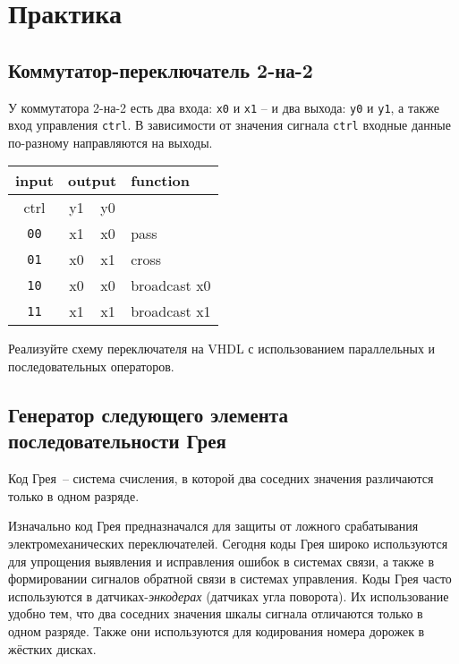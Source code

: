 \section{Практика}
\subsection{Коммутатор-переключатель 2-на-2}
У коммутатора 2-на-2 есть два входа: \lstinline?x0? и \lstinline?x1? – и два выхода: \lstinline?y0? и \lstinline?y1?, а также вход управления \lstinline?ctrl?. В зависимости от значения сигнала \lstinline?ctrl? входные данные по-разному направляются на выходы.
\begin{table}[h]
\centering
\begin{tabular}{|c|c|c|l|}
\hline
input       & \multicolumn{2}{c|}{output} & function     \\ \hline
ctrl        & y1 & y0                    &              \\ \hline
\texttt{00} & x1 & x0                    & pass         \\
\texttt{01} & x0 & x1                    & cross        \\
\texttt{10} & x0 & x0                    & broadcast x0 \\
\texttt{11} & x1 & x1                    & broadcast x1 \\
\hline
\end{tabular}
\end{table}

 Реализуйте схему переключателя на VHDL с использованием параллельных и последовательных операторов.

\subsection{Генератор следующего элемента последовательности Грея}
Код Грея~-- система счисления, в которой два соседних значения различаются только в одном разряде.

Изначально код Грея предназначался для защиты от ложного срабатывания электромеханических переключателей. Сегодня коды Грея широко используются для упрощения выявления и исправления ошибок в системах связи, а также в формировании сигналов обратной связи в системах управления. Коды Грея часто используются в датчиках-\emph{энкодерах} (датчиках угла поворота). Их использование удобно тем, что два соседних значения шкалы сигнала отличаются только в одном разряде. Также они используются для кодирования номера дорожек в жёстких дисках.

